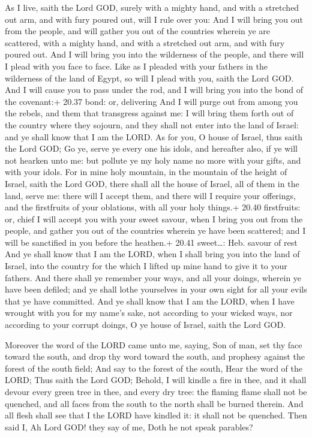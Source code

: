  As I live, saith the Lord GOD, surely with a mighty
hand, and with a stretched out arm, and with fury poured out, will I
rule over you:  And I will bring you out from the people,
and will gather you out of the countries wherein ye are scattered, with
a mighty hand, and with a stretched out arm, and with fury poured out.
 And I will bring you into the wilderness of the people,
and there will I plead with you face to face.  Like as I
pleaded with your fathers in the wilderness of the land of Egypt, so
will I plead with you, saith the Lord GOD.  And I will
cause you to pass under the rod, and I will bring you into the bond of
the covenant:+ 20.37 bond: or, delivering  And I will purge
out from among you the rebels, and them that transgress against me: I
will bring them forth out of the country where they sojourn, and they
shall not enter into the land of Israel: and ye shall know that I am the
LORD.  As for you, O house of Israel, thus saith the Lord
GOD; Go ye, serve ye every one his idols, and hereafter also, if ye will
not hearken unto me: but pollute ye my holy name no more with your
gifts, and with your idols.  For in mine holy mountain, in
the mountain of the height of Israel, saith the Lord GOD, there shall
all the house of Israel, all of them in the land, serve me: there will I
accept them, and there will I require your offerings, and the
firstfruits of your oblations, with all your holy things.+ 20.40
firstfruits: or, chief  I will accept you with your sweet
savour, when I bring you out from the people, and gather you out of the
countries wherein ye have been scattered; and I will be sanctified in
you before the heathen.+ 20.41 sweet\ldots: Heb. savour of rest
 And ye shall know that I am the LORD, when I shall bring
you into the land of Israel, into the country for the which I lifted up
mine hand to give it to your fathers.  And there shall ye
remember your ways, and all your doings, wherein ye have been defiled;
and ye shall lothe yourselves in your own sight for all your evils that
ye have committed.  And ye shall know that I am the LORD,
when I have wrought with you for my name's sake, not according to your
wicked ways, nor according to your corrupt doings, O ye house of Israel,
saith the Lord GOD.

 Moreover the word of the LORD came unto me, saying,
 Son of man, set thy face toward the south, and drop thy
word toward the south, and prophesy against the forest of the south
field;  And say to the forest of the south, Hear the word
of the LORD; Thus saith the Lord GOD; Behold, I will kindle a fire in
thee, and it shall devour every green tree in thee, and every dry tree:
the flaming flame shall not be quenched, and all faces from the south to
the north shall be burned therein.  And all flesh shall see
that I the LORD have kindled it: it shall not be quenched. 
Then said I, Ah Lord GOD! they say of me, Doth he not speak parables?

